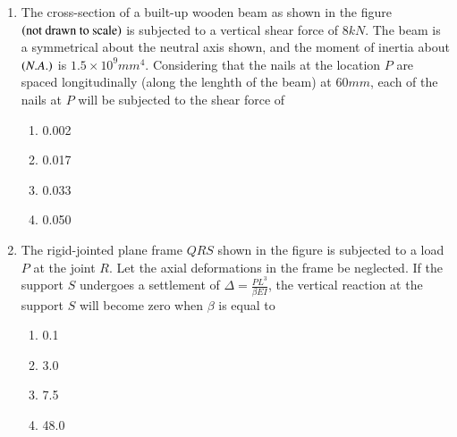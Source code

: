 \documentclass[journal,12pt,onecolumn]{IEEEtran}
\theoremstyle{remark}
\begin{document}
\begin{enumerate}
\begin{multicols}{4}
\begin{enumerate}
                    \columnbreak
                \item $\frac{ \ln \phi}{\ln\phi\ln\Psi - 1}$
                    \columnbreak
                \item $\frac{\ln \Psi}{\ln\phi\ln\Psi - 1}$
            \end{enumerate}
        \end{multicols}
    \item The cross-section of a built-up wooden beam as shown in the figure $\left(\text{not drawn to scale}\right)$
        is subjected to a vertical shear force of $8kN$. The beam is a symmetrical about the neutral axis
         shown, and the moment of inertia about $\left(N.A.\right)$ is $1.5 \times 10^9 mm^4$.
        Considering that the nails at the location $P$ are spaced longitudinally (along the lenghth of the beam)
        at $60mm$, each of the nails at $P$ will be subjected to the shear force of 
\begin{center}
            \resizebox{0.3\textwidth}{!}{
                
            } 
        \end{center}
        \hfill{}
        \begin{multicols}{4}
            \begin{enumerate}
                \item 0.002
                    \columnbreak
                \item 0.017
                    \columnbreak
                \item 0.033
                    \columnbreak
                \item 0.050
            \end{enumerate}
        \end{multicols}


    \item The rigid-jointed plane frame $QRS$ shown in the figure is subjected to a load $P$ at the 
        joint $R$. Let the axial deformations in the frame be neglected. If the support $S$ undergoes
        a settlement of $\Delta = \frac{PL^3}{\beta EI}$, the vertical reaction at the support $S$
        will become zero when $\beta$ is equal to 
\begin{center}
            \resizebox{0.3\textwidth}{!}{
                
            } 
        \end{center}
        \hfill{}
        \begin{multicols}{4}
            \begin{enumerate}
                \item 0.1
                    \columnbreak
                \item 3.0
                    \columnbreak
                \item 7.5
                    \columnbreak
                \item 48.0
            \end{enumerate}
        \end{multicols}


\end{enumerate}
\end{document}
